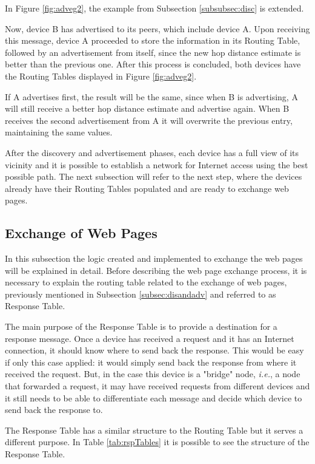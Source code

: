 In Figure \ref{fig:adveg2}, the example from Subsection \ref{subsubsec:disc} is extended.

Now, device B has advertised to its peers, which include device A. Upon receiving this message, device A proceeded to store the information in its Routing Table, followed by an advertisement from itself, since the new hop distance estimate is better than the previous one. After this process is concluded, both devices have the Routing Tables displayed in Figure \ref{fig:adveg2}.

If A advertises first, the result will be the same, since when B is advertising, A will still receive a better hop distance estimate and advertise again. When B receives the second advertisement from A it will overwrite the previous entry, maintaining the same values.

After the discovery and advertisement phases, each device has a full view of its vicinity and it is possible to establish a network for Internet access using the best possible path. The next subsection will refer to the next step, where the devices already have their Routing Tables populated and are ready to exchange web pages.

\subsection{Exchange of Web Pages}
\label{subsec:exch}

In this subsection the logic created and implemented to exchange the web pages will be explained in detail. Before describing the web page exchange process, it is necessary to explain the routing table related to the exchange of web pages, previously mentioned in Subsection \ref{subsec:disandadv} and referred to as Response Table.

The main purpose of the Response Table is to provide a destination for a response message. Once a device has received a request and it has an Internet connection, it should know where to send back the response. This would be easy if only this case applied: it would simply send back the response from where it received the request. But, in the case this device is a "bridge" node, \textit{i.e.}, a node that forwarded a request, it may have received requests from different devices and it still needs to be able to differentiate each message and decide which device to send back the response to.

The Response Table has a similar structure to the Routing Table but it serves a different purpose. In Table \ref{tab:rspTables} it is possible to see the structure of the Response Table.

